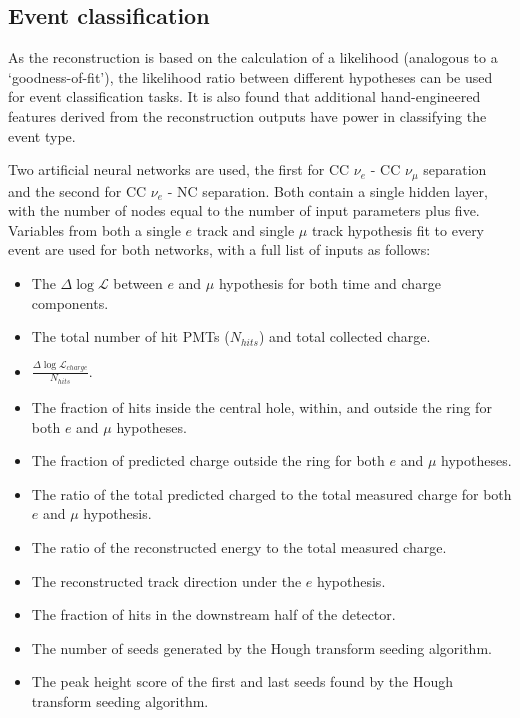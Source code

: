 \subsection{Event classification}%
\label{sec:cvn_old_pid} %

As the reconstruction is based on the calculation of a likelihood (analogous to a
`goodness-of-fit'), the likelihood ratio between different hypotheses can be used for event
classification tasks. It is also found that additional hand-engineered features derived from the
reconstruction outputs have power in classifying the event type.

Two artificial neural networks are used, the first for CC $\nu_{e}$ - CC $\nu_{\mu}$ separation
and the second for CC $\nu_{e}$ - NC separation. Both contain a single hidden layer, with the
number of nodes equal to the number of input parameters plus five. Variables from both a single
$e$ track and single $\mu$ track hypothesis fit to every event are used for both networks, with a
full list of inputs as follows:
\begin{itemize}
    \item The $\Delta\log\mathcal{L}$ between $e$ and $\mu$ hypothesis for both time and
          charge components.
    \item The total number of hit PMTs ($N_{hits}$) and total collected charge.
    \item $\frac{\Delta\log\mathcal{L}_{charge}}{N_{hits}}$.
    \item The fraction of hits inside the central hole, within, and outside the ring for both
          $e$ and $\mu$ hypotheses.
    \item The fraction of predicted charge outside the ring for both $e$ and $\mu$ hypotheses.
    \item The ratio of the total predicted charged to the total measured charge for both $e$
          and $\mu$ hypothesis.
    \item The ratio of the reconstructed energy to the total measured charge.
    \item The reconstructed track direction under the $e$ hypothesis.
    \item The fraction of hits in the downstream half of the detector.
    \item The number of seeds generated by the Hough transform seeding algorithm.
    \item The peak height score of the first and last seeds found by the Hough transform seeding
          algorithm.
\end{itemize}

